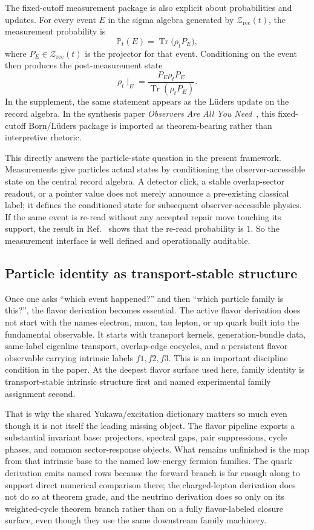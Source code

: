 \documentclass[11pt]{article}
\begin{document}
The fixed-cutoff measurement package is also explicit about probabilities and updates. For every
event \(E\) in the sigma algebra generated by \(\mathcal Z_{\mathrm{rec}}(t)\), the measurement
probability is
\[
\mathbb P_t(E)=\operatorname{Tr}\!\bigl(\rho_t P_E\bigr),
\]
where \(P_E\in\mathcal Z_{\mathrm{rec}}(t)\) is the projector for that event. Conditioning on the
event then produces the post-measurement state
\[
\rho_t\!\mid_E
=
\frac{P_E\rho_t P_E}{\operatorname{Tr}(\rho_t P_E)}.
\]
In the supplement, the same statement appears as the L\"uders update on the record algebra. In
the synthesis paper \emph{Observers Are All You Need}~\cite{ophsynthesis}, this fixed-cutoff Born/L\"uders package is imported as theorem-bearing
rather than interpretive rhetoric.

This directly answers the particle-state question in the present framework. Measurements give particles
actual states by conditioning the observer-accessible state on the central record algebra. A
detector click, a stable overlap-sector readout, or a pointer value does not merely announce a
pre-existing classical label; it defines the conditioned state for subsequent observer-accessible
physics. If the same event is re-read without any accepted repair move touching its support, the
result in Ref.~\cite{ophmicrophysics} shows that the re-read probability is \(1\). So the measurement interface is
well defined and operationally auditable.

\subsection{Particle identity as transport-stable structure}

Once one asks ``which event happened?'' and then ``which particle family is this?'', the
flavor derivation becomes essential. The active flavor derivation does not start with the
names electron, muon, tau lepton, or up quark built into the fundamental observable. It starts
with transport kernels, generation-bundle data, same-label eigenline transport, overlap-edge
cocycles, and a persistent flavor observable carrying intrinsic labels \(f1,f2,f3\). This is an
important discipline condition in the paper. At the deepest flavor surface used here, family
identity is transport-stable intrinsic structure first and named experimental family assignment
second.

That is why the shared Yukawa/excitation dictionary matters so much even though it is not
itself the leading missing object. The flavor pipeline exports a substantial invariant base:
projectors, spectral gaps, pair suppressions, cycle phases, and common sector-response objects.
What remains unfinished is the map from that intrinsic base to the named low-energy fermion
families. The quark derivation emits named rows because the forward branch is far enough along to
support direct numerical comparison there; the charged-lepton derivation does not do so at theorem
grade, and the neutrino derivation does so only on its weighted-cycle theorem branch rather than
on a fully flavor-labeled closure surface, even though they use the same downstream family machinery.
\end{document}
